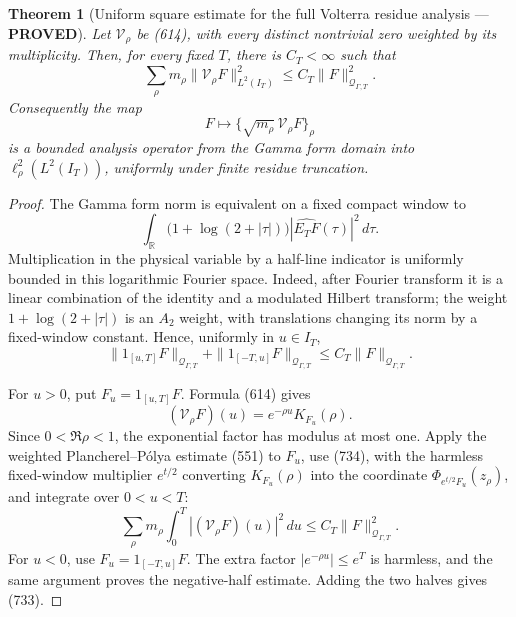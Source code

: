 \documentclass[11pt]{article}
\newtheorem{theorem}{Theorem}
\newcommand{\PROVED}{\textcolor{green!45!black}{\textbf{PROVED}}}
\begin{document}
\begin{theorem}[Uniform square estimate for the full Volterra residue
analysis --- \PROVED]
Let \(\mathcal V_\rho\) be (614), with every distinct nontrivial zero
weighted by its multiplicity.  Then, for every fixed \(T\), there is
\(C_T<\infty\) such that
\begin{equation}
 \boxed{
 \sum_{\rho}m_\rho
 \|\mathcal V_\rho F\|_{L^2(I_T)}^2
 \le C_T\|F\|_{\mathcal Q_{\Gamma,T}}^2.}           \tag{733}
\end{equation}
Consequently the map
\[
 F\longmapsto\{\sqrt{m_\rho}\,\mathcal V_\rho F\}_\rho
\]
is a bounded analysis operator from the Gamma form domain into
\(\ell^2_\rho(L^2(I_T))\), uniformly under finite residue truncation.
\end{theorem}

\begin{proof}
The Gamma form norm is equivalent on a fixed compact window to
\[
 \int_{\mathbb R}
  \bigl(1+\log(2+|\tau|)\bigr)|\widehat{E_TF}(\tau)|^2\,d\tau.
\]
Multiplication in the physical variable by a half-line indicator is
uniformly bounded in this logarithmic Fourier space.  Indeed, after
Fourier transform it is a linear combination of the identity and a
modulated Hilbert transform; the weight
\(1+\log(2+|\tau|)\) is an \(A_2\) weight, with translations changing its
norm by a fixed-window constant.  Hence, uniformly in \(u\in I_T\),
\begin{equation}
 \|1_{[u,T]}F\|_{\mathcal Q_{\Gamma,T}}
 +\|1_{[-T,u]}F\|_{\mathcal Q_{\Gamma,T}}
 \le C_T\|F\|_{\mathcal Q_{\Gamma,T}}.              \tag{734}
\end{equation}

For \(u>0\), put \(F_u=1_{[u,T]}F\).  Formula (614) gives
\[
 (\mathcal V_\rho F)(u)=e^{-\rho u}K_{F_u}(\rho).
\]
Since \(0<\Re\rho<1\), the exponential factor has modulus at most one.
Apply the weighted Plancherel--Pólya estimate (551) to \(F_u\), use (734),
with the harmless fixed-window multiplier \(e^{t/2}\) converting
\(K_{F_u}(\rho)\) into the coordinate \(\Phi_{e^{t/2}F_u}(z_\rho)\), and
integrate over \(0<u<T\):
\[
 \sum_\rho m_\rho
 \int_0^T|(\mathcal V_\rho F)(u)|^2\,du
 \le C_T\|F\|_{\mathcal Q_{\Gamma,T}}^2.
\]
For \(u<0\), use \(F_u=1_{[-T,u]}F\).  The extra factor
\(|e^{-\rho u}|\le e^T\) is harmless, and the same argument proves the
negative-half estimate.  Adding the two halves gives (733).
\end{proof}
\end{document}
